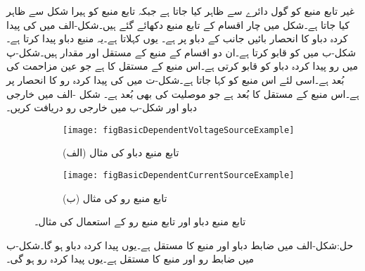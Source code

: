 غیر تابع منبع کو گول دائرے سے ظاہر کیا جاتا ہے جبکہ تابع منبع کو ہیرا شکل سے ظاہر کیا جاتا ہے۔شکل  میں چار اقسام کے تابع منبع دکھائے گئے ہیں۔شکل-الف میں  کی پیدا کردہ دباو کا انحصار بائیں جانب  کے دباو  پر ہے۔ یوں   کہلاتا ہے۔یہ منبع  دباو پیدا کرتا ہے۔ شکل-ب میں  کو  قابو کرتا ہے۔ان دو اقسام کے منبع کے مستقل  اور   مقدار ہیں۔شکل-پ میں  رو پیدا کردہ دباو کو قابو کرتی ہے۔اس منبع کے مستقل  کا   ہے جو عین مزاحمت کی بُعد ہے۔اسی لئے اس منبع کو  کہا جاتا ہے۔شکل-ت میں  کی پیدا کردہ رو کا انحصار  پر ہے۔اس منبع کے مستقل  کا بُعد  ہے جو موصلیت کی بھی بُعد ہے۔
شکل -الف میں خارجی دباو اور شکل-ب میں خارجی رو دریافت کریں۔

\begin{figure}
\centering
\begin{subfigure}{0.5\textwidth}
\centering
\texttt{[image: figBasicDependentVoltageSourceExample]}
\caption*{(الف) تابع منبع دباو کی مثال}
\end{subfigure}%
%
\begin{subfigure}{0.5\textwidth}
\centering
\texttt{[image: figBasicDependentCurrentSourceExample]}
\caption*{(ب) تابع منبع رو کی مثال}
\end{subfigure}%
\caption{تابع منبع دباو اور تابع منبع رو کے استعمال کی مثال۔}
\label{شکل_تابع_منبع_دباو_اور_رو_استعمال}
\end{figure} 

حل:شکل-الف میں ضابط دباو  اور منبع کا مستقل  ہے۔یوں پیدا کردہ دباو  ہو گا۔شکل-ب میں ضابط رو  اور منبع کا مستقل  ہے۔یوں پیدا کردہ رو  ہو گی۔


